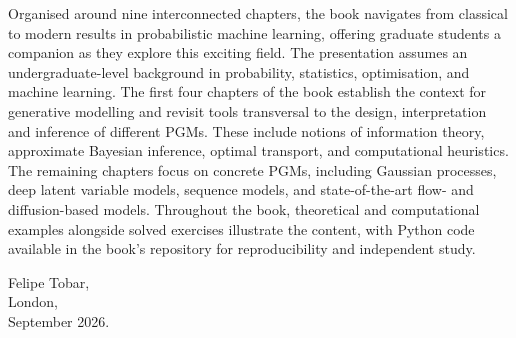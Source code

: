 Organised around nine interconnected chapters, the book navigates from classical to modern results in probabilistic machine learning, offering graduate students a companion as they explore this exciting field. The presentation assumes an undergraduate-level background in probability, statistics, optimisation, and machine learning. The first four chapters of the book establish the context for generative modelling and revisit tools transversal to the design, interpretation and inference of different PGMs. These include notions of information theory, approximate Bayesian inference, optimal transport, and computational heuristics. The remaining chapters focus on concrete PGMs, including Gaussian processes, deep latent variable models, sequence models, and state-of-the-art flow- and diffusion-based models. Throughout the book, theoretical and computational examples alongside solved exercises illustrate the content, with Python code available in the book's repository for reproducibility and independent study. 


\vspace{1em}
\noindent Felipe Tobar, \\
London, \\
September 2026. 